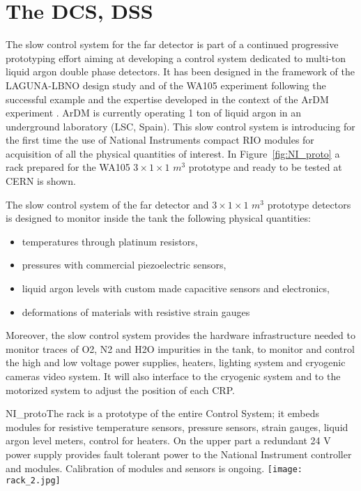 \section{The DCS, DSS} 
\label{sec:detectors-fd-alt-dcs}

The slow control system for the far detector is part of a continued progressive prototyping effort aiming at developing a control system dedicated to multi-ton liquid argon double phase detectors. It has been designed in the framework of the LAGUNA-LBNO design study and of the WA105 experiment following the successful example and the expertise developed in the context of the ArDM experiment  \cite{Badertscher:2013ygt}. ArDM  is currently operating 1 ton of liquid argon in an underground laboratory (LSC, Spain).  This slow control system is introducing for the first time the use of National Instruments compact RIO modules for acquisition of all the physical quantities of interest. In Figure~\ref{fig:NI_proto} a rack prepared for the WA105  $3 \times 1 \times 1$ $m^3$ prototype and ready to be tested at CERN is shown.

The slow control system of the far detector and $3 \times 1 \times 1$ $m^3$ prototype detectors is designed to monitor inside the tank the following physical quantities:

\begin{itemize}
  \item temperatures through platinum resistors,
  \item pressures with commercial piezoelectric sensors,
  \item liquid argon levels with custom made capacitive sensors and electronics,
  \item deformations of materials with resistive strain gauges
\end{itemize} 

Moreover, the slow control system  provides the hardware infrastructure needed to monitor traces of O2, N2 and H2O impurities in the tank, to monitor and control the high and low voltage power supplies, heaters, lighting system and cryogenic cameras video system. It will also interface to the cryogenic system and to the motorized system to adjust the position of each CRP. 

\begin{cdrfigure}{NI_proto}{The rack is a prototype of the entire Control System; it  embeds modules for resistive temperature sensors, pressure  sensors, strain gauges, liquid argon level meters, control for  heaters. On the upper part a redundant 24 V power supply provides
 fault tolerant power to the National Instrument controller and modules. Calibration of modules and sensors is ongoing.}
\texttt{[image: rack\_2.jpg]}
\end{cdrfigure}

